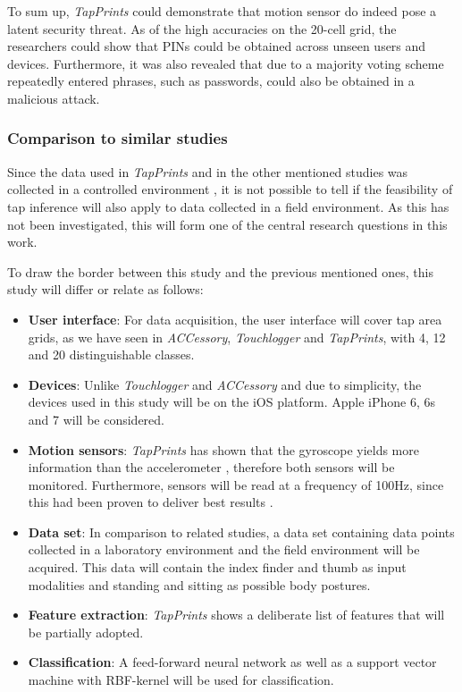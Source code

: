 To sum up, \textit{TapPrints} could demonstrate that motion sensor do indeed pose a latent security threat. As of the high accuracies on the 20-cell grid, the researchers could show that PINs could be obtained across unseen users and devices. Furthermore, it was also revealed that due to a majority voting scheme repeatedly entered phrases, such as passwords, could also be obtained in a malicious attack.

\subsubsection{Comparison to similar studies}

Since the data used in \textit{TapPrints} and in the other mentioned studies was collected in a controlled environment \cite{Accessory,Touchlogger,Tapprints}, it is not possible to tell if the feasibility of tap inference will also apply to data collected in a field environment. As this has not been investigated, this will form one of the central research questions in this work.

To draw the border between this study and the previous mentioned ones, this study will differ or relate as follows:
\begin{itemize}
  \item \textbf{User interface}: For data acquisition, the user interface will cover tap area grids, as we have seen in \textit{ACCessory}, \textit{Touchlogger} and \textit{TapPrints}, with 4, 12 and 20 distinguishable classes.
  \item \textbf{Devices}: Unlike \textit{Touchlogger} and \textit{ACCessory} and due to simplicity, the devices used in this study will be on the iOS platform. Apple iPhone 6, 6s and 7 will be considered.
  \item \textbf{Motion sensors}: \textit{TapPrints} has shown that the gyroscope yields more information than the accelerometer \cite{Tapprints}, therefore both sensors will be monitored. Furthermore, sensors will be read at a frequency of 100Hz, since this had been proven to deliver best results \cite{Tapprints, Accessory}.
  \item \textbf{Data set}: In comparison to related studies, a data set containing data points collected in a laboratory environment and the field environment will be acquired. This data will contain the index finder and thumb as input modalities and standing and sitting as possible body postures.
  \item \textbf{Feature extraction}: \textit{TapPrints} shows a deliberate list of features \cite{Tapprints} that will be partially adopted.
  \item \textbf{Classification}: A feed-forward neural network as well as a support vector machine with RBF-kernel will be used for classification.
\end{itemize}

